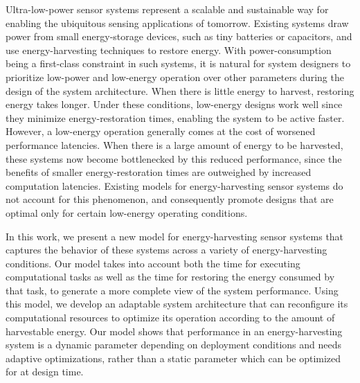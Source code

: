 Ultra-low-power sensor systems represent a scalable and sustainable way for enabling the ubiquitous sensing applications of tomorrow. 
%
Existing systems draw power from small energy-storage devices, such as tiny batteries or capacitors, and use energy-harvesting techniques to restore energy.
%
With power-consumption being a first-class constraint in such systems, it is natural for system designers to prioritize low-power and low-energy operation over other parameters during the design of the system architecture. 
%
When there is little energy to harvest, restoring energy takes longer. 
%
Under these conditions, low-energy designs work well since they minimize energy-restoration times, enabling the system to be active faster. 
%
However, a low-energy operation generally comes at the cost of worsened performance latencies. 
%
When there is a large amount of energy to be harvested, these systems now become bottlenecked by this reduced performance, since the benefits of smaller energy-restoration times are outweighed by increased computation latencies.
%
Existing models for energy-harvesting sensor systems do not account for this phenomenon, and consequently promote designs that are optimal only for certain low-energy operating conditions.

In this work, we present a new model for energy-harvesting sensor systems that captures the behavior of these systems across a variety of energy-harvesting conditions. 
%
Our model takes into account both the time for executing computational tasks as well as the time for restoring the energy consumed by that task, to generate a more complete view of the system performance. 
%
Using this model, we develop an adaptable system architecture that can reconfigure its computational resources to optimize its operation according to the amount of harvestable energy. 
%
Our model shows that performance in an energy-harvesting system is a dynamic parameter depending on deployment conditions and needs adaptive optimizations, rather than a static parameter which can be optimized for at design time.

